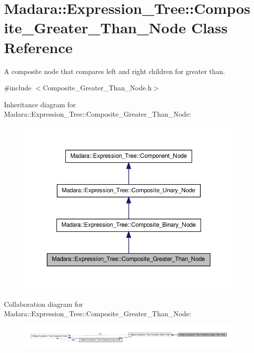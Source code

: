\hypertarget{classMadara_1_1Expression__Tree_1_1Composite__Greater__Than__Node}{
\section{Madara::Expression\_\-Tree::Composite\_\-Greater\_\-Than\_\-Node Class Reference}
\label{d1/dc8/classMadara_1_1Expression__Tree_1_1Composite__Greater__Than__Node}
}


A composite node that compares left and right children for greater than.  




{\ttfamily \#include $<$Composite\_\-Greater\_\-Than\_\-Node.h$>$}



Inheritance diagram for Madara::Expression\_\-Tree::Composite\_\-Greater\_\-Than\_\-Node:
\nopagebreak
\begin{figure}[H]
\begin{center}
\leavevmode
\includegraphics[width=354pt]{d4/d3e/classMadara_1_1Expression__Tree_1_1Composite__Greater__Than__Node__inherit__graph}
\end{center}
\end{figure}


Collaboration diagram for Madara::Expression\_\-Tree::Composite\_\-Greater\_\-Than\_\-Node:
\nopagebreak
\begin{figure}[H]
\begin{center}
\leavevmode
\includegraphics[width=400pt]{dd/d51/classMadara_1_1Expression__Tree_1_1Composite__Greater__Than__Node__coll__graph}
\end{center}
\end{figure}
